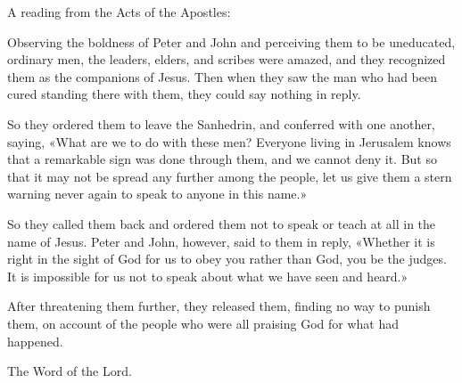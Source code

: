\indent A reading from the Acts of the Apostles:

Observing the boldness of Peter and John and perceiving them to be uneducated, ordinary men, the leaders, elders, and scribes were amazed, and they recognized them as the companions of Jesus. Then when they saw the man who had been cured standing there with them, they could say nothing in reply. 

So they ordered them to leave the Sanhedrin, and conferred with one another, saying, «What are we to do with these men? Everyone living in Jerusalem knows that a remarkable sign was done through them, and we cannot deny it. But so that it may not be spread any further among the people, let us give them a stern warning never again to speak to anyone in this name.» 

So they called them back and ordered them not to speak or teach at all in the name of Jesus. Peter and John, however, said to them in reply, «Whether it is right in the sight of God for us to obey you rather than God, you be the judges. It is impossible for us not to speak about what we have seen and heard.» 

After threatening them further, they released them, finding no way to punish them, on account of the people who were all praising God for what had happened.

The Word of the Lord.